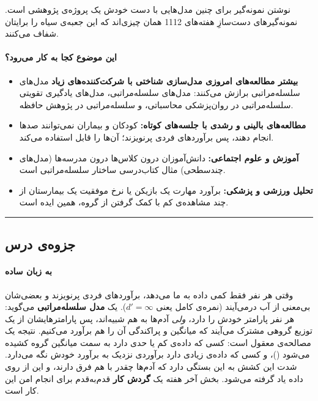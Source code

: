 نوشتن نمونه‌گیر برای چنین مدل‌هایی با دست خودش یک پروژه‌ی پژوهشی است.
نمونه‌گیرهای دست‌سازِ هفته‌های 11\lr{--}12 همان چیزی‌اند که این جعبه‌ی سیاه را
برایتان شفاف می‌کنند.

\paragraph{این موضوع کجا به کار می‌رود؟}

\begin{itemize}
\tightlist
\item
  \textbf{بیشتر مطالعه‌های امروزی مدل‌سازی شناختی با شرکت‌کننده‌های زیاد}
  مدل‌های سلسله‌مراتبی برازش می‌کنند: مدل‌های 
  سلسله‌مراتبی، مدل‌های یادگیری تقویتی سلسله‌مراتبی در
  روان‌پزشکی محاسباتی، و  سلسله‌مراتبی در پژوهش حافظه.
\item
  \textbf{مطالعه‌های بالینی و رشدی با جلسه‌های کوتاه:} کودکان و بیماران
  نمی‌توانند صدها  انجام دهند، پس برآوردهای فردی پرنویزند؛
   آن‌ها را قابل استفاده می‌کند.
\item
  \textbf{آموزش و علوم اجتماعی:} دانش‌آموزان درون کلاس‌ها درون مدرسه‌ها
  (مدل‌های چندسطحی) مثال کتاب‌درسی ساختار سلسله‌مراتبی است.
\item
  \textbf{تحلیل ورزشی و پزشکی:} برآورد مهارت یک بازیکن یا نرخ موفقیت یک
  بیمارستان از چند مشاهده‌ی کم با کمک گرفتن از گروه، همین ایده است.
\end{itemize}

\begin{center}\rule{0.5\linewidth}{0.5pt}\end{center}


\subsection{جزوه‌ی درس}

\paragraph{به زبان ساده}

وقتی هر نفر فقط کمی داده به ما می‌دهد، برآوردهای فردی پرنویزند و بعضی‌شان
بی‌معنی از آب درمی‌آیند (نمره‌ی کامل یعنی \(d' = \infty\)). یک \textbf{مدل
سلسله‌مراتبی} می‌گوید: هر نفر پارامتر خودش را دارد، \emph{ولی} آدم‌ها به هم
شبیه‌اند، پس پارامترهایشان از یک توزیع گروهی مشترک می‌آیند که میانگین و
پراکندگی آن را هم برآورد می‌کنیم. نتیجه یک مصالحه‌ی معقول است: کسی که
داده‌ی کم یا حدی دارد به سمت میانگین گروه کشیده می‌شود
(\textbf{})، و کسی که داده‌ی زیادی دارد برآوردی نزدیک به
برآورد خودش نگه می‌دارد. شدت این کشش به این بستگی دارد که آدم‌ها چقدر با
هم فرق دارند، و این از روی داده یاد گرفته می‌شود. بخش آخر هفته یک
\textbf{گردش کار } قدم‌به‌قدم برای انجام امن این کار است.

